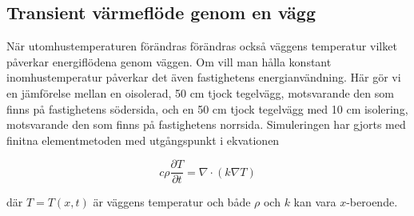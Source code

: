 \subsection{Transient värmeflöde genom en vägg}

När utomhustemperaturen förändras förändras också väggens temperatur vilket påverkar energiflödena genom väggen. Om vill man hålla konstant inomhustemperatur påverkar det även fastighetens energianvändning. Här gör vi en jämförelse mellan en oisolerad, 50 cm tjock tegelvägg, motsvarande den som finns på fastighetens södersida, och en 50 cm tjock tegelvägg med 10 cm isolering, motsvarande den som finns på fastighetens norrsida. Simuleringen har gjorts med finitna elementmetoden med utgångspunkt i ekvationen

\begin{equation}
c\rho \frac{\partial T}{\partial t} = \nabla \cdot (k \nabla T)
\end{equation}

där $T=T(x,t)$ är väggens temperatur och både $\rho$ och $k$ kan vara $x$-beroende.

